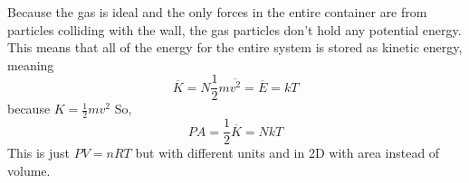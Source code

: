 \documentclass{article}
\begin{document}
Because the gas is ideal and the only forces in the entire container are from particles colliding with the wall, the gas particles don't hold any potential energy. This means that all of the energy for the entire system is stored as kinetic energy, meaning $$\overline K = N\frac{1}{2} m\overline{v^2} = \overline E = kT$$ because $K = \frac{1}{2} mv^2$ So,
$$ PA = \frac{1}{2} \overline K = NkT$$
This is just $PV=nRT$ but with different units and in 2D with area instead of volume.
\end{document}
